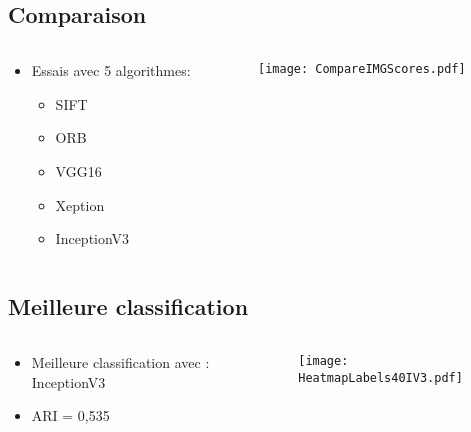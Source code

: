 \documentclass[8pt,aspectratio=169,hyperref={unicode=true}]{beamer}
\begin{document}
\subsection{Comparaison}
\begin{frame}{\insertsubsection}
    \begin{columns}
        \begin{column}{.4\textwidth}
            \begin{itemize}
                \item Essais avec 5 algorithmes:
                      \begin{itemize}
                          \item SIFT
                          \item ORB
                          \item VGG16
                          \item Xeption
                          \item InceptionV3
                      \end{itemize}
            \end{itemize}
        \end{column}
        \begin{column}{.6\textwidth}
            \texttt{[image: CompareIMGScores.pdf]}
        \end{column}
    \end{columns}
\end{frame}

\subsection{Meilleure classification}
\begin{frame}{\insertsubsection}
    \begin{columns}
        \begin{column}{.4\textwidth}
            \begin{itemize}
                \item Meilleure classification avec : InceptionV3
                \item ARI = 0,535
            \end{itemize}
        \end{column}
        \begin{column}{.6\textwidth}
            \texttt{[image: HeatmapLabels40IV3.pdf]}
        \end{column}
    \end{columns}
\end{frame}
\end{document}
